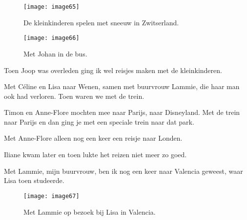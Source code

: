 \begin{figure}[h]
    \texttt{[image: image65]}
    \caption{De kleinkinderen spelen met sneeuw in Zwitserland.}
\end{figure}

\begin{figure}[h]
    \texttt{[image: image66]}
    \caption{Met Johan in de bus.}
\end{figure}


Toen Joop was overleden ging ik wel reisjes maken met de kleinkinderen. 

Met C\'{e}line en Lisa naar Wenen, samen met buurvrouw Lammie, die haar man ook had verloren. Toen waren we met de trein. 

Timon en Anne-Flore mochten mee naar Parijs, naar Disneyland. Met de trein naar Parijs en dan ging je met een speciale trein naar dat park. 

Met Anne-Flore alleen nog een keer een reisje naar Londen. 

Iliane kwam later en toen lukte het reizen niet meer zo goed. 

Met Lammie, mijn buurvrouw, ben ik nog een keer naar Valencia geweest, waar Lisa toen studeerde.

\begin{figure}[h]
    \texttt{[image: image67]}
    \caption{Met Lammie op bezoek bij Lisa in Valencia.}
\end{figure}